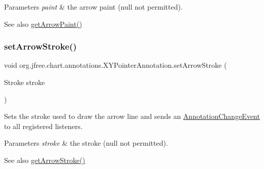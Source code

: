 \begin{DoxyParams}{Parameters}
{\em paint} & the arrow paint ({\ttfamily null} not permitted).\\
\hline
\end{DoxyParams}
\begin{DoxySeeAlso}{See also}
\mbox{\hyperlink{classorg_1_1jfree_1_1chart_1_1annotations_1_1_x_y_pointer_annotation_ac53a34b1e682d8e7dc1df7ec30ee7e46}{get\+Arrow\+Paint()}} 
\end{DoxySeeAlso}
\mbox{\label{classorg_1_1jfree_1_1chart_1_1annotations_1_1_x_y_pointer_annotation_a88f681ba5b883b0888bda7c6b229d603}} 
\subsubsection{\texorpdfstring{set\+Arrow\+Stroke()}{setArrowStroke()}}
{\footnotesize\ttfamily void org.\+jfree.\+chart.\+annotations.\+X\+Y\+Pointer\+Annotation.\+set\+Arrow\+Stroke (\begin{DoxyParamCaption}\item[{Stroke}]{stroke }\end{DoxyParamCaption})}

Sets the stroke used to draw the arrow line and sends an \mbox{\hyperlink{}{Annotation\+Change\+Event}} to all registered listeners.


\begin{DoxyParams}{Parameters}
{\em stroke} & the stroke ({\ttfamily null} not permitted).\\
\hline
\end{DoxyParams}
\begin{DoxySeeAlso}{See also}
\mbox{\hyperlink{classorg_1_1jfree_1_1chart_1_1annotations_1_1_x_y_pointer_annotation_a1862ff709839409de0275283c50830fa}{get\+Arrow\+Stroke()}} 
\end{DoxySeeAlso}
\mbox{\label{classorg_1_1jfree_1_1chart_1_1annotations_1_1_x_y_pointer_annotation_a1b32ced8b4ccb41c6e7fe98ca225f726}} 
